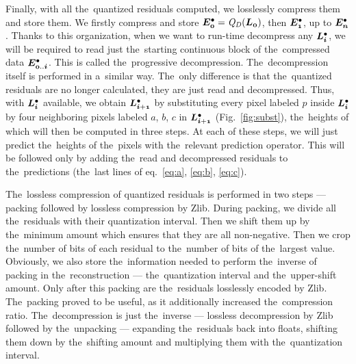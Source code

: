  Finally, with all the~quantized residuals computed, we losslessly compress them and store them. We firstly compress and store $\objdot{E}{0} = \opnorm{Q}{D}(\lnorm{0})$, then $\objdot{E}{1}$, up to $\objdot{E}{n}$. Thanks to this organization, when we want to run-time decompress any $\ldot{i}$, we will be required to read just the~starting continuous block of the~compressed data $\objdot{E}{0..i}$. This is called the~progressive decompression. The~decompression itself is performed in a~similar way. The~only difference is that the~quantized residuals are no longer calculated, they are just read and decompressed. Thus, with $\ldot{i}$ available, we obtain $\ldot{i+1}$ by substituting every pixel labeled $p$ inside $\ldot{i}$ by four neighboring pixels labeled $a$, $b$, $c$ in $\ldot{i+1}$ (Fig.~\ref{fig:subst}), the~heights of which will then be computed in three steps. At each of these steps, we will just predict the~heights of the~pixels with the~relevant prediction operator. This will be followed only by adding the~read and decompressed residuals  to the~predictions (the~last lines of eq.~\ref{eq:a}, \ref{eq:b}, \ref{eq:c}).
 
  The~lossless compression of quantized residuals is performed in two steps --- packing followed by lossless compression by Zlib. During packing, we divide all the~residuals with their quantization interval. Then we shift them up by the~minimum amount which ensures that they are all non-negative. Then we crop the~number of bits of each residual to the~number of bits of the~largest value. Obviously, we also store the~information needed to perform the~inverse of packing in the~reconstruction --- the~quantization interval and the~upper-shift amount. Only after this packing are the~residuals losslessly encoded by Zlib. The~packing proved to be useful, as it additionally increased the~compression ratio. The~decompression is just the~inverse --- lossless decompression by Zlib followed by the~unpacking --- expanding the~residuals back into floats, shifting them down by the~shifting amount and multiplying them with the~quantization interval.
